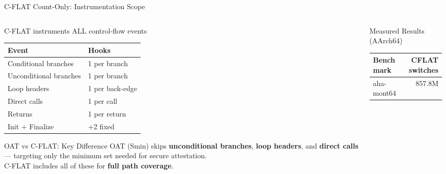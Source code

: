 \documentclass[aspectratio=169, 10pt]{beamer}
\begin{document}
\begin{frame}{C-FLAT Count-Only: Instrumentation Scope}
    \begin{columns}[T]
        \begin{column}{0.48\textwidth}
            \begin{defbox}{C-FLAT instruments ALL control-flow events}
                \scriptsize
                \renewcommand{\arraystretch}{1.3}
                \begin{tabular}{ll}
                    \textbf{Event} & \textbf{Hooks} \\
                    \hline
                    Conditional branches  & 1 per branch \\
                    Unconditional branches & 1 per branch \\
                    Loop headers          & 1 per back-edge \\
                    Direct calls          & 1 per call \\
                    Returns               & 1 per return \\
                    Init + Finalize       & +2 fixed \\
                \end{tabular}
            \end{defbox}
            \vspace{4pt}
            \begin{warnbox}{OAT vs C-FLAT: Key Difference}
                \scriptsize OAT (Smin) skips \textbf{unconditional branches},
                \textbf{loop headers}, and \textbf{direct calls} --- targeting only
                the minimum set needed for secure attestation.\\[3pt]
                C-FLAT includes all of these for \textbf{full path coverage}.
            \end{warnbox}
        \end{column}
        \begin{column}{0.48\textwidth}
            \begin{greenbox}{Measured Results (AArch64)}
                \scriptsize
                \renewcommand{\arraystretch}{1.2}
                \begin{tabular}{lr}
                    \textbf{Benchmark} & \textbf{CFLAT switches} \\
                    \hline
                    aha-mont64     & 857.8M \\

\end{tabular}
\end{greenbox}
\end{column}
\end{columns}
\end{frame}
\end{document}
